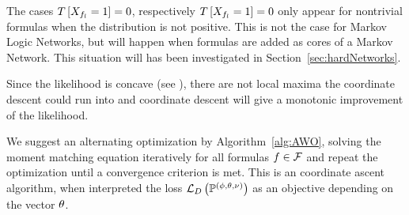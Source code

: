 %
The cases $T\left[X_{f_{l}}=1\right]=0$, respectively $T\left[X_{f_{l}}=1\right]=0$ only appear for nontrivial formulas when the distribution is not positive. 
This is not the case for Markov Logic Networks, but will happen when formulas are added as cores of a Markov Network.
This situation will has been investigated in Section~\ref{sec:hardNetworks}.


Since the likelihood is concave (see \cite{koller_probabilistic_2009}), there are not local maxima the coordinate descent could run into and coordinate descent will give a monotonic improvement of the likelihood. 

We suggest an alternating optimization by Algorithm~\ref{alg:AWO}, solving the moment matching equation iteratively for all formulas $f\in\mathcal{F}$ and repeat the optimization until a convergence criterion is met.
This is an coordinate ascent algorithm, when interpreted the loss $\mathcal{L}_{D}\left(\mathbb{P}^{(\phi,\theta,\nu)}\right)$ as an objective depending on the vector $\theta$.

